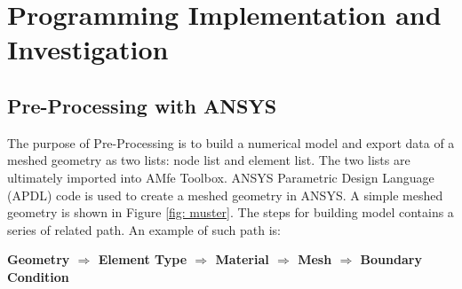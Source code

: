 \chapter{Programming Implementation and Investigation}
\section{Pre-Processing with ANSYS}
The purpose of Pre-Processing is to build a numerical model and export data of a meshed geometry as two lists: node list and element list.  The two lists are ultimately imported into AMfe Toolbox. ANSYS Parametric Design Language (APDL) code is used to create a meshed geometry in ANSYS. A simple meshed geometry is shown in Figure \ref{fig: muster}. The steps for building model contains a series of related path. An example of such path is: 

\begin{center}
	\large{\textbf{Geometry $\Rightarrow$ Element Type $\Rightarrow$ Material $\Rightarrow$ Mesh
			$\Rightarrow$ Boundary Condition  }}
\end{center}


